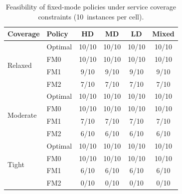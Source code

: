 \begin{table}[H]
\centering
\caption{Feasibility of fixed-mode policies under service coverage constraints (10~instances per cell).}
\label{tab:app_coverage_infeasibility}
\small
\renewcommand{\arraystretch}{1.3}
\begin{tabular}{ll cccc}
\toprule
{Coverage} & {Policy} & {HD} & {MD} & {LD} & {Mixed} \\
\midrule
\multirow{4}{*}{Relaxed} & Optimal & 10/10 & 10/10 & 10/10 & 10/10 \\
 & FM0 & 10/10 & 10/10 & 10/10 & 10/10 \\
 & FM1 & 9/10 & 9/10 & 9/10 & 9/10 \\
 & FM2 & 7/10 & 7/10 & 7/10 & 7/10 \\
\midrule
\multirow{4}{*}{Moderate} & Optimal & 10/10 & 10/10 & 10/10 & 10/10 \\
 & FM0 & 10/10 & 10/10 & 10/10 & 10/10 \\
 & FM1 & 7/10 & 7/10 & 7/10 & 7/10 \\
 & FM2 & 6/10 & 6/10 & 6/10 & 6/10 \\
\midrule
\multirow{4}{*}{Tight} & Optimal & 10/10 & 10/10 & 10/10 & 10/10 \\
 & FM0 & 10/10 & 10/10 & 10/10 & 10/10 \\
 & FM1 & 6/10 & 6/10 & 6/10 & 6/10 \\
 & FM2 & 0/10 & 0/10 & 0/10 & 0/10 \\
\bottomrule
\end{tabular}
\end{table}